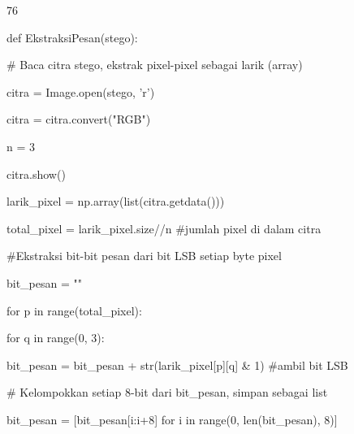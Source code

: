 \documentclass{article}
\begin{document}

76

def EkstraksiPesan(stego):    

  \# Baca citra stego, ekstrak pixel-pixel sebagai larik (array)    

  citra = Image.open(stego, 'r’) 

  citra = citra.convert("RGB")

  n = 3  

  citra.show()   

  larik\_pixel = np.array(list(citra.getdata()))   


  total\_pixel = larik\_pixel.size//n     \#jumlah pixel di dalam citra    

  \#Ekstraksi bit-bit pesan dari bit LSB setiap byte pixel   

  bit\_pesan = ""   

  for p in range(total\_pixel):       

     for q in range(0, 3):

        bit\_pesan = bit\_pesan + str(larik\_pixel[p][q] \& 1) \#ambil bit LSB        


  \# Kelompokkan setiap 8-bit dari bit\_pesan, simpan sebagai list          

  bit\_pesan = [bit\_pesan[i:i+8] for i in range(0, len(bit\_pesan), 8)]
\end{document}
